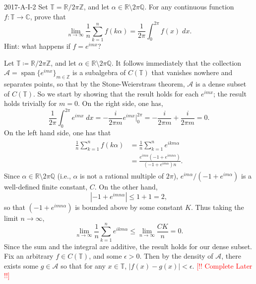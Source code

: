 \documentclass{article}
\newcommand{\complete}{\textcolor{red}{[!! Complete Later !!]}}
\begin{document}
	\begin{prb}{2017-A-I-2}
		Set $\mathbb{T} = \mathbb{R}/2\pi \mathbb{Z}$, and let $\alpha \in \mathbb{R}\setminus 2\pi \mathbb{Q}$. For any continuous function $f: \mathbb{T} \to \mathbb{C}$, prove that 
		\begin{equation*}
			\lim_{n \to \infty}\frac{1}{n}\sum_{k = 1}^{n}f(k\alpha) = \frac{1}{2\pi}\int_{0}^{2\pi}f(x)\;dx. 
		\end{equation*}
		Hint: what happens if $f = e^{imx}$? 
	\end{prb}
	Let $\mathbb{T} \coloneqq \mathbb{R}/2\pi \mathbb{Z}$, and let $\alpha \in \mathbb{R}\setminus 2\pi \mathbb{Q}$. It follows immediately that the collection $\mathcal{A} = \operatorname{span}\{e^{imx}\}_{m \in \mathbb{Z}}$ is a subalgebra of $C(\mathbb{T})$ that vanishes nowhere and separates points, so that by the Stone-Weierstrass theorem, $\mathcal{A}$ is a dense subset of $C(\mathbb{T})$. So we start by showing that the result holds for each $e^{imx}$; the result holds trivially for $m= 0$. On the right side, one has, 
	\begin{equation*}
		\frac{1}{2\pi}\int_{0}^{2\pi}e^{imx}\;dx = -\frac{i}{2\pi m}e^{imx}\bigg|_{0}^{2\pi} = -\frac{i}{2\pi m} + \frac{i}{2\pi m} = 0. 
	\end{equation*}
	On the left hand side, one has that 
	\begin{align*}
		\begin{split}
			\frac{1}{n}\sum_{k = 1}^{n}f(k\alpha) &= \frac{1}{n}\sum_{k = 1}^{n}e^{ikm\alpha} \\
			&= \frac{e^{im\alpha}(-1 + e^{imn\alpha})}{(-1 + e^{im\alpha})n}. 
		\end{split}
	\end{align*}
	Since $\alpha \in \mathbb{R} \setminus 2\pi \mathbb{Q}$ (i.e., $\alpha$ is not a rational multiple of $2\pi$), $e^{im\alpha}/(-1 + e^{im\alpha})$ is a well-defined finite constant, $C$. On the other hand, 
	\begin{equation*}
		|-1 + e^{imn\alpha}| \leq 1 + 1 = 2, 
	\end{equation*}
	so that $(-1 + e^{imn\alpha})$ is bounded above by some constant $K$. Thus taking the limit $n \to \infty$, 
	\begin{equation*}
		\lim_{n \to \infty}\frac{1}{n}\sum_{k = 1}^{n}e^{ikm\alpha} \leq \lim_{n \to \infty} \frac{CK}{n} = 0. 
	\end{equation*}
	Since the sum and the integral are additive, the result holds for our dense subset. Fix an arbitrary $f \in C(\mathbb{T})$, and some $\epsilon > 0$. Then by the density of $\mathcal{A}$, there exists some $g \in \mathcal{A}$ so that for any $x \in \mathbb{T}$, $|f(x) - g(x)| < \epsilon$. \complete 
	
\end{document}
